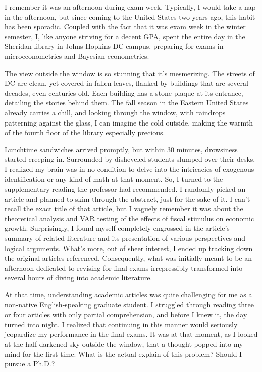 
I remember it was an afternoon during exam week. Typically, I would take a nap in the afternoon, but since coming to the United States two years ago, this habit has been sporadic. Coupled with the fact that it was exam week in the winter semester, I, like anyone striving for a decent GPA, spent the entire day in the Sheridan library in Johns Hopkins DC campus, preparing for exams in microeconometrics and Bayesian econometrics.

The view outside the window is so stunning that it's mesmerizing. The streets of DC are clean, yet covered in fallen leaves, flanked by buildings that are several decades, even centuries old. Each building has a stone plaque at its entrance, detailing the stories behind them. The fall season in the Eastern United States already carries a chill, and looking through the window, with raindrops patterning against the glass, I can imagine the cold outside, making the warmth of the fourth floor of the library especially precious.

Lunchtime sandwiches arrived promptly, but within 30 minutes, drowsiness started creeping in. Surrounded by disheveled students slumped over their desks, I realized my brain was in no condition to delve into the intricacies of exogenous identification or any kind of math at that moment. So, I turned to the supplementary reading the professor had recommended. I randomly picked an article and planned to skim through the abstract, just for the sake of it. I can't recall the exact title of that article, but I vaguely remember it was about the theoretical analysis and VAR testing of the effects of fiscal stimulus on economic growth. Surprisingly, I found myself completely engrossed in the article's summary of related literature and its presentation of various perspectives and logical arguments. What's more, out of sheer interest, I ended up tracking down the original articles referenced. Consequently, what was initially meant to be an afternoon dedicated to revising for final exams irrepressibly transformed into several hours of diving into academic literature.

At that time, understanding academic articles was quite challenging for me as a non-native English-speaking graduate student. I struggled through reading three or four articles with only partial comprehension, and before I knew it, the day turned into night. I realized that continuing in this manner would seriously jeopardize my performance in the final exams. It was at that moment, as I looked at the half-darkened sky outside the window, that a thought popped into my mind for the first time: What is the actual explain of this problem? Should I pursue a Ph.D.?


